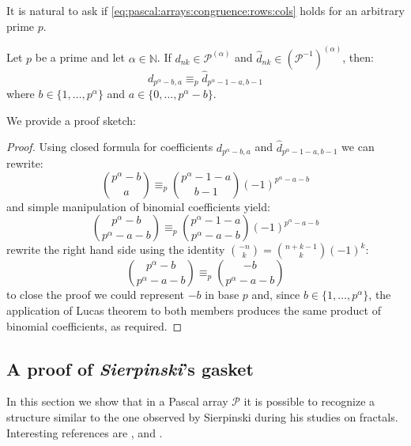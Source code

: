 It is natural to ask if \autoref{eq:pascal:arrays:congruence:rows:cols}
holds for an arbitrary prime $p$.
\begin{conjecture}
    Let $p$ be a prime and let $\alpha\in\mathbb{N}$. 
    If $d_{nk}\in\mathcal{P}^{(\alpha)}$ and
    $\hat{d}_{nk}\in\left(\mathcal{P}^{-1}\right)^{(\alpha)}$, then:
    \begin{equation}
        d_{p^\alpha -b,a} \equiv_{p} \hat{d}_{p^\alpha -1-a,b-1} 
    \end{equation}
    where $b\in\lbrace1,\ldots,p^{\alpha}\rbrace$ and 
    $a\in\lbrace 0,\ldots,p^{\alpha}-b\rbrace$.
\end{conjecture}
We provide a proof sketch:
\begin{proof}
    Using closed formula for coefficients $d_{p^\alpha -b,a}$ and $\hat{d}_{p^\alpha -1-a,b-1}$
    we can rewrite:
    \begin{displaymath}
        {{p^\alpha -b} \choose {a}} \equiv_{p} {{p^\alpha -1-a}\choose{b-1} }\left(-1\right)^{p^{\alpha}-a-b}
    \end{displaymath}
    and simple manipulation of binomial coefficients yield:
    \begin{displaymath}
        {{p^\alpha -b} \choose {p^\alpha -a-b}} \equiv_{p} 
            {{p^\alpha -1-a}\choose{p^\alpha -a-b} }\left(-1\right)^{p^{\alpha}-a-b}
    \end{displaymath}
    rewrite the right hand side using the identity ${{-n}\choose{k}}={{n+k-1}\choose{k}}(-1)^{k}$:
    \begin{displaymath}
        {{p^\alpha -b} \choose {p^\alpha -a-b}} \equiv_{p} 
            {{-b}\choose{p^\alpha -a-b} }
    \end{displaymath}
    to close the proof we could represent $-b$ in base $p$ and, 
    since $b\in\lbrace1,\ldots,p^{\alpha}\rbrace$, the application of
    Lucas theorem to both members produces the same product of binomial
    coefficients, as required.

\end{proof}

\subsection{A proof of \emph{Sierpinski}'s gasket}

In this section we show that in a Pascal array $\mathcal{P}$ it is possible to
recognize a structure similar to the one observed by Sierpinski during his
studies on fractals. Interesting references are \cite{sokolov},
\cite{stewart:four:encounters:sierpinski} and \cite{barnsley}.

